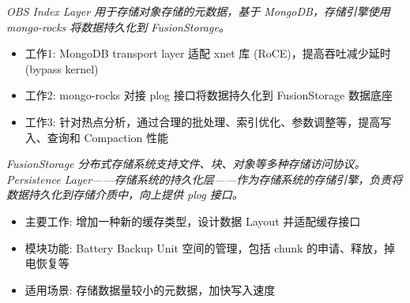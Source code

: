 \documentclass{resume}
\begin{document}
\textit{OBS Index Layer 用于存储对象存储的元数据，基于 MongoDB，存储引擎使用 mongo-rocks 将数据持久化到 FusionStorage。}
\begin{onehalfspacing}
\begin{itemize}
  \item 工作1: MongoDB transport layer 适配 xnet 库 (RoCE)，提高吞吐减少延时 (bypass kernel)
  \item 工作2: mongo-rocks 对接 plog 接口将数据持久化到 FusionStorage 数据底座
  \item 工作3: 针对热点分析，通过合理的批处理、索引优化、参数调整等，提高写入、查询和 Compaction 性能
\end{itemize}
\end{onehalfspacing}

\textit{FusionStorage 分布式存储系统支持文件、块、对象等多种存储访问协议。Persistence Layer——存储系统的持久化层——作为存储系统的存储引擎，负责将数据持久化到存储介质中，向上提供 plog 接口。}
\begin{onehalfspacing}
\begin{itemize}
  \item 主要工作: 增加一种新的缓存类型，设计数据 Layout 并适配缓存接口
  \item 模块功能: Battery Backup Unit 空间的管理，包括 chunk 的申请、释放，掉电恢复等
  \item 适用场景: 存储数据量较小的元数据，加快写入速度
\end{itemize}
\end{onehalfspacing}
\end{document}
